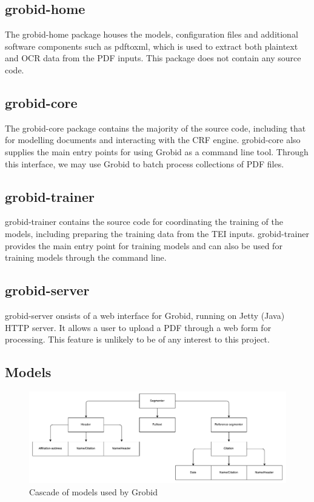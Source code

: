 \documentclass[11pt, oneside]{scrartcl}   	%
\begin{document}
\subsection{grobid-home}

The grobid-home package houses the models, configuration files and additional software components such as pdftoxml, which is used to extract both plaintext and OCR data from the PDF inputs. This package does not contain any source code.

\subsection{grobid-core}

The grobid-core package contains the majority of the source code, including that for modelling documents and interacting with the CRF engine. grobid-core also supplies the main entry points for using Grobid as a command line tool. Through this interface, we may use Grobid to batch process collections of PDF files.

\subsection{grobid-trainer}

grobid-trainer contains the source code for coordinating the training of the models, including preparing the training data from the TEI inputs. grobid-trainer provides the main entry point for training models and can also be used for training models through the command line.

\subsection{grobid-server}

grobid-server onsists of a web interface for Grobid, running on Jetty (Java) HTTP server. It allows a user to upload a PDF through a web form for processing. This feature is unlikely to be of any interest to this project.

\subsection{Models}

\begin{figure}[!ht]
\center
\includegraphics[width=7in]{figures/cascade.pdf}
\caption{Cascade of models used by Grobid}
\label{fig:cascade}
\end{figure}
\end{document}
